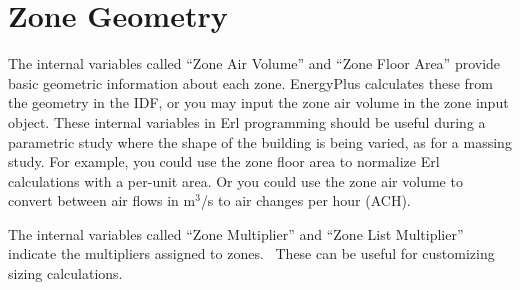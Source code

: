 \section{Zone Geometry}\label{zone-geometry}

The internal variables called ``Zone Air Volume'' and ``Zone Floor Area'' provide basic geometric information about each zone. EnergyPlus calculates these from the geometry in the IDF, or you may input the zone air volume in the zone input object. These internal variables in Erl programming should be useful during a parametric study where the shape of the building is being varied, as for a massing study. For example, you could use the zone floor area to normalize Erl calculations with a per-unit area. Or you could use the zone air volume to convert between air flows in m\(^{3}\)/s to air changes per hour (ACH).

The internal variables called ``Zone Multiplier'' and ``Zone List Multiplier'' indicate the multipliers assigned to zones.~ These can be useful for customizing sizing calculations.
